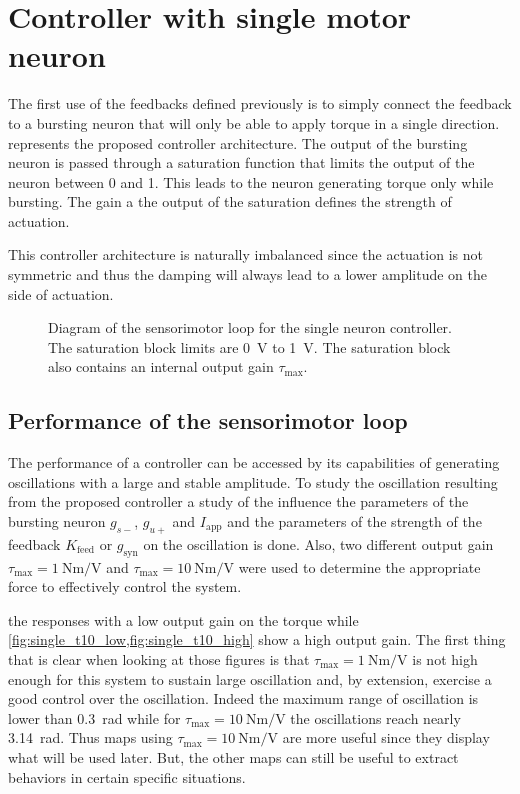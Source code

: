 \section{Controller with single motor neuron}

The first use of the feedbacks defined previously is to simply connect the feedback to a bursting neuron that will only be able to apply torque in a single direction.  represents the proposed controller architecture. The output of the bursting neuron is passed through a saturation function that limits the output of the neuron between 0 and 1. This leads to the neuron generating torque only while bursting. The gain a the output of the saturation defines the strength of actuation. 

This controller architecture is naturally imbalanced since the actuation is not symmetric and thus the damping will always lead to a lower amplitude on the side of actuation. 

\begin{figure}[!htb]
    \centering
    \caption{Diagram of the sensorimotor loop for the single neuron controller. The saturation block limits are \qty{0}{\volt} to \qty{1}{\volt}. The saturation block also contains an internal output gain $\tau_\text{max}$.}
    \label{fig:one_motor}
\end{figure}


\subsection{Performance of the sensorimotor loop}

The performance of a controller can be accessed by its capabilities of generating oscillations with a large and stable amplitude. To study the oscillation resulting from the proposed controller a study of the influence the parameters of the bursting neuron $g_{s-}$, $g_{u+}$ and $I_\text{app}$ and the parameters of the strength of the feedback $K_\text{feed}$ or $g_\text{syn}$ on the oscillation is done. Also, two different output gain $\tau_\text{max} = \qty{1}{\newton\meter\per\volt}$ and $\tau_\text{max} = \qty{10}{\newton\meter\per\volt}$ were used to determine the appropriate force to effectively control the system. 

  the responses with a low output gain on the torque while \cref{fig:single_t10_low,fig:single_t10_high} show a high output gain. The first thing that is clear when looking at those figures is that $\tau_\text{max} = \qty{1}{\newton\meter\per\volt}$ is not high enough for this system to sustain large oscillation and, by extension, exercise a good control over the oscillation. Indeed the maximum range of oscillation is lower than \qty{0.3}{\radian} while for $\tau_\text{max} = \qty{10}{\newton\meter\per\volt}$ the oscillations reach nearly \qty{3.14}{\radian}. Thus maps using $\tau_\text{max} = \qty{10}{\newton\meter\per\volt}$ are more useful since they display what will be used later. But, the other maps can still be useful to extract behaviors in certain specific situations.

